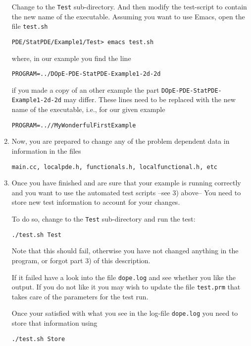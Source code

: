 \begin{enumerate}
  Change to the \texttt{Test} sub-directory. And then modify the
  test-script to contain the new name of the executable.
  Assuming you want to use Emacs, open the file \texttt{test.sh}
\begin{verbatim}
PDE/StatPDE/Example1/Test> emacs test.sh
\end{verbatim}
where, in our example you find the line
\begin{verbatim}
PROGRAM=../DOpE-PDE-StatPDE-Example1-2d-2d
\end{verbatim} 
if you made a copy of an other example the part \texttt{DOpE-PDE-StatPDE-Example1-2d-2d}
may differ. These lines need to be replaced with the new name of the 
executable, i.e., for our given example
\begin{verbatim}
PROGRAM=..//MyWonderfulFirstExample
\end{verbatim} 

\item  Now, you are prepared to change any of the problem
  dependent data in information in the files 
\begin{verbatim}
main.cc, localpde.h, functionals.h, localfunctional.h, etc
\end{verbatim} 

\item Once you have finished and are sure that your example is running correctly
  and you want to use the automated test scripts --see 3) above-- You need 
  to store new test information to account for your changes. 
  
  To do so, change to the \texttt{Test} sub-directory and run the test:
\begin{verbatim}
./test.sh Test
\end{verbatim}
  Note that this should fail, otherwise you have not changed anything in the program, 
  or forgot part 3) of this description.
  
  If it failed have a look into the file \texttt{dope.log} and see whether you like the 
  output. If you do not like it you may wish to update the file \texttt{test.prm} that 
  takes care of the parameters for the test run.
  
  Once your satisfied with what you see in the log-file \texttt{dope.log} you need to store 
  that information using
\begin{verbatim}
./test.sh Store
\end{verbatim}
\end{enumerate}


